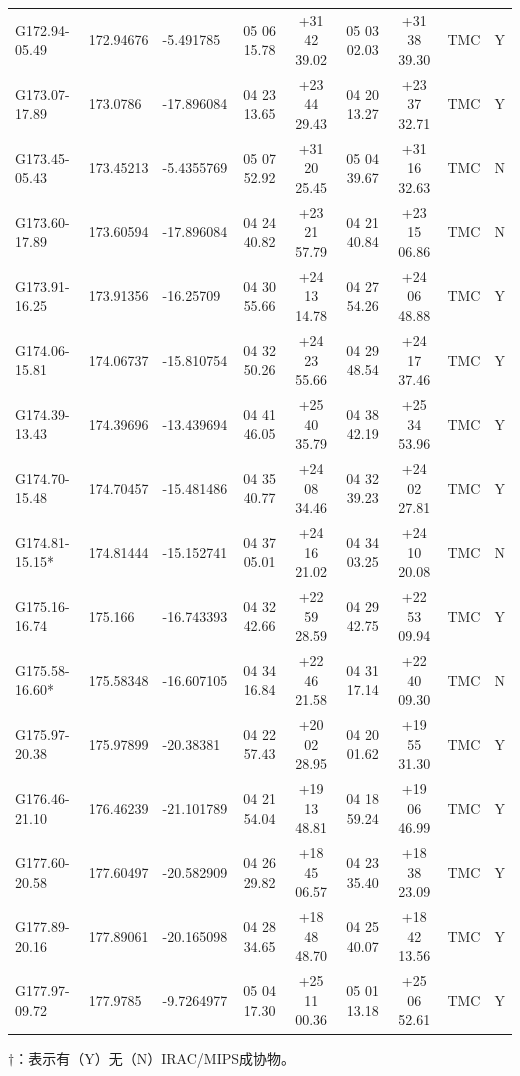 \documentclass[UTF8, nocolorlinks]{pkuthss}
\begin{document}
\begin{footnotesize}
\begin{center}
\begin{supertabular}{lllcccclr}
		G172.94-05.49 & 172.94676 &   -5.491785   & 05 06 15.78 & +31 42 39.02 & 05 03 02.03 & +31 38 39.30   & TMC  & Y\\
		G173.07-17.89 & 173.0786  &  -17.896084   & 04 23 13.65 & +23 44 29.43 & 04 20 13.27 & +23 37 32.71   & TMC  & Y\\
		G173.45-05.43 & 173.45213 &   -5.4355769  & 05 07 52.92 & +31 20 25.45 & 05 04 39.67 & +31 16 32.63   & TMC  & N\\
		G173.60-17.89 & 173.60594 &  -17.896084   & 04 24 40.82 & +23 21 57.79 & 04 21 40.84 & +23 15 06.86   & TMC  & N\\
		G173.91-16.25 & 173.91356 &  -16.25709    & 04 30 55.66 & +24 13 14.78 & 04 27 54.26 & +24 06 48.88   & TMC  & Y\\
		G174.06-15.81 & 174.06737 &  -15.810754   & 04 32 50.26 & +24 23 55.66 & 04 29 48.54 & +24 17 37.46   & TMC  & Y\\
		G174.39-13.43 & 174.39696 &  -13.439694   & 04 41 46.05 & +25 40 35.79 & 04 38 42.19 & +25 34 53.96   & TMC  & Y\\
		G174.70-15.48 & 174.70457 &  -15.481486   & 04 35 40.77 & +24 08 34.46 & 04 32 39.23 & +24 02 27.81   & TMC  & Y\\
		G174.81-15.15*& 174.81444 &  -15.152741   & 04 37 05.01 & +24 16 21.02 & 04 34 03.25 & +24 10 20.08   & TMC  & N\\
		G175.16-16.74 & 175.166   &  -16.743393   & 04 32 42.66 & +22 59 28.59 & 04 29 42.75 & +22 53 09.94   & TMC  & Y\\
		G175.58-16.60*& 175.58348 &  -16.607105   & 04 34 16.84 & +22 46 21.58 & 04 31 17.14 & +22 40 09.30   & TMC  & N\\
		G175.97-20.38 & 175.97899 &  -20.38381    & 04 22 57.43 & +20 02 28.95 & 04 20 01.62 & +19 55 31.30   & TMC  & Y\\
		G176.46-21.10 & 176.46239 &  -21.101789   & 04 21 54.04 & +19 13 48.81 & 04 18 59.24 & +19 06 46.99   & TMC  & Y\\
		G177.60-20.58 & 177.60497 &  -20.582909   & 04 26 29.82 & +18 45 06.57 & 04 23 35.40 & +18 38 23.09   & TMC  & Y\\
		G177.89-20.16 & 177.89061 &  -20.165098   & 04 28 34.65 & +18 48 48.70 & 04 25 40.07 & +18 42 13.56   & TMC  & Y\\
		G177.97-09.72 & 177.9785  &   -9.7264977  & 05 04 17.30 & +25 11 00.36 & 05 01 13.18 & +25 06 52.61   & TMC  & Y\\
		\end{supertabular}		
		\end{center}
		$\dagger$：表示有（Y）无（N）IRAC/MIPS成协物。
		\end{footnotesize}
\end{document}
